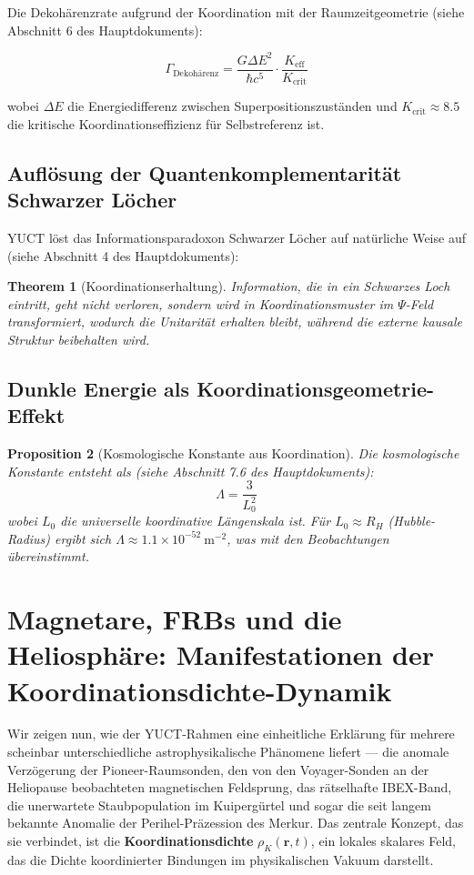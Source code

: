 \documentclass[12pt,a4paper]{article}
\newtheorem{theorem}{Theorem}[section]
\newtheorem{proposition}[theorem]{Proposition}
\theoremstyle{remark}
\newcommand{\Keff}{K_{\mathrm{eff}}}
\begin{document}
	Die Dekohärenzrate aufgrund der Koordination mit der Raumzeitgeometrie (siehe Abschnitt 6 des Hauptdokuments):
	
	\begin{equation}
		\Gamma_{\text{Dekohärenz}} = \frac{G \Delta E^2}{\hbar c^5} \cdot \frac{\Keff}{K_{\text{crit}}}
	\end{equation}
	
	wobei $\Delta E$ die Energiedifferenz zwischen Superpositionszuständen und $K_{\text{crit}} \approx 8.5$ die kritische Koordinationseffizienz für Selbstreferenz ist.
	
	\subsection{Auflösung der Quantenkomplementarität Schwarzer Löcher}
	
	YUCT löst das Informationsparadoxon Schwarzer Löcher auf natürliche Weise auf (siehe Abschnitt 4 des Hauptdokuments):
	
	\begin{theorem}[Koordinationserhaltung]
		Information, die in ein Schwarzes Loch eintritt, geht nicht verloren, sondern wird in Koordinationsmuster im $\Psi$-Feld transformiert, wodurch die Unitarität erhalten bleibt, während die externe kausale Struktur beibehalten wird.
	\end{theorem}
	
	\subsection{Dunkle Energie als Koordinationsgeometrie-Effekt}
	
	\begin{proposition}[Kosmologische Konstante aus Koordination]
		Die kosmologische Konstante entsteht als (siehe Abschnitt 7.6 des Hauptdokuments):
		\[
		\Lambda = \frac{3}{L_0^2}
		\]
		wobei $L_0$ die universelle koordinative Längenskala ist. Für $L_0 \approx R_H$ (Hubble-Radius) ergibt sich $\Lambda \approx 1.1 \times 10^{-52}\ \text{m}^{-2}$, was mit den Beobachtungen übereinstimmt.
	\end{proposition}
	
	\section{Magnetare, FRBs und die Heliosphäre: Manifestationen der Koordinationsdichte-Dynamik}
	\label{sec:coord_density}
	
	Wir zeigen nun, wie der YUCT-Rahmen eine einheitliche Erklärung für mehrere scheinbar unterschiedliche astrophysikalische Phänomene liefert — die anomale Verzögerung der Pioneer-Raumsonden, den von den Voyager-Sonden an der Heliopause beobachteten magnetischen Feldsprung, das rätselhafte IBEX-Band, die unerwartete Staubpopulation im Kuipergürtel und sogar die seit langem bekannte Anomalie der Perihel-Präzession des Merkur. Das zentrale Konzept, das sie verbindet, ist die \textbf{Koordinationsdichte} $\rho_K(\mathbf{r},t)$, ein lokales skalares Feld, das die Dichte koordinierter Bindungen im physikalischen Vakuum darstellt.
	
\end{document}
